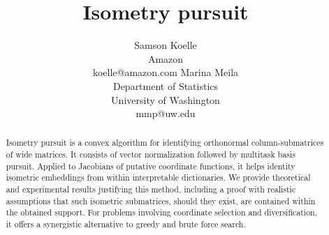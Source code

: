 \documentclass{article}
\title{Isometry pursuit}
\author{%
  Samson Koelle \\
  Amazon  \\
  koelle@amazon.com
  \And
  Marina Meila \\
  Department of Statistics\\
  University of Washington \\
  mmp@uw.edu
}
\begin{document}
\maketitle

\begin{abstract}
Isometry pursuit is a convex algorithm for identifying orthonormal column-submatrices of wide matrices.
It consists of vector normalization followed by multitask basis pursuit.
Applied to Jacobians of putative coordinate functions, it helps identity isometric embeddings from within interpretable dictionaries.
We provide theoretical and experimental results justifying this method, including a proof with realistic assumptions that such isometric submatrices, should they exist, are contained within the obtained support.
For problems involving coordinate selection and diversification, it offers a synergistic alternative to greedy and brute force search.
\end{abstract}








\newpage

%

\newpage


\end{document}
